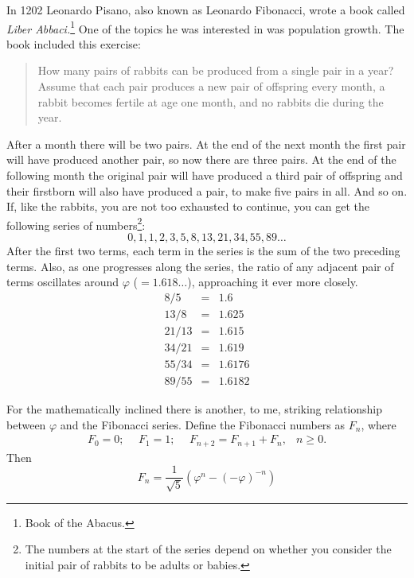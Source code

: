 \documentclass[10pt,letterpaper]{memoir}
\begin{document}
    In 1202 Leonardo Pisano, 
also known as Leonardo Fibonacci, wrote a
book called \textit{Liber Abbaci.}\footnote{Book of the Abacus.} One of the 
topics he was interested in was population growth. The book included
this exercise: 
\begin{quote}
How many pairs of rabbits can be produced from a single 
pair in a year?
Assume that each pair produces a new pair of offspring every month,
a rabbit becomes fertile at age one month, and no rabbits die during the
year.
\end{quote}
After a month there will be two pairs. At the end of the next month the
first pair will have produced another pair, so now there are three pairs.
At the end of the following  month the original pair will have produced a
third pair of offspring and their firstborn will also have produced a pair, 
to make five pairs in all. And so on. 
If, like the rabbits, you are not too exhausted
to continue, you can get the following series of 
numbers\footnote{The numbers at the start of the series
depend on whether you consider the initial pair of rabbits to be adults or 
babies.\label{fn:rabbits}}:
\begin{displaymath}
0,1,1,2,3,5,8,13,21,34, 55, 89 \ldots
\end{displaymath}
After the first two terms, each term in the series is the sum of the two
preceding terms. Also, as one progresses along the series, the ratio of
any adjacent pair of terms oscillates around $\varphi$ ($= 1.618 \ldots$),
approaching it ever more closely.
\begin{eqnarray*}
  8/5 & = & 1.6 \\
  13/8 & = & 1.625 \\
  21/13 & = & 1.615 \\
  34/21 & = & 1.619 \\
  55/34 & = & 1.6176 \\
  89/55 & = & 1.6182
\end{eqnarray*}

    For the mathematically inclined there is another, to me, striking
relationship between $\varphi$ and the Fibonacci series. Define the
Fibonacci numbers as $F_{n}$, where
\begin{equation}
\begin{array}{cccc}
F_{0} = 0;\ \ & F_{1}=1;\ \ & F_{n+2}=F_{n+1} + F_{n},  &  n \geq 0.
\end{array}
\end{equation}
Then
\begin{equation}
 F_{n} = \frac{1}{\sqrt{5}}(\varphi^{n} - (- \varphi)^{-n})
\end{equation}
\end{document}
